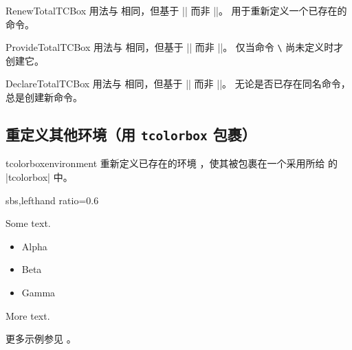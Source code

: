\clearpage

\begin{docCommand}{RenewTotalTCBox}{}
  用法与  相同，但基于 |\RenewDocumentCommand| 而非 |\NewDocumentCommand|。
  用于重新定义一个已存在的命令。
\end{docCommand}

\begin{docCommand}{ProvideTotalTCBox}{}
  用法与  相同，但基于 |\ProvideDocumentCommand| 而非 |\NewDocumentCommand|。
  仅当命令 \texttt{\textbackslash} 尚未定义时才创建它。
\end{docCommand}

\begin{docCommand}{DeclareTotalTCBox}{}
  用法与  相同，但基于 |\DeclareDocumentCommand| 而非 |\NewDocumentCommand|。
  无论是否已存在同名命令，总是创建新命令。
\end{docCommand}



\subsection{重定义其他环境（用 \texttt{tcolorbox} 包裹）}\label{subsec:macros_refine}

\begin{docCommand}[doc new=2014-10-20]{tcolorboxenvironment}{}
  重新定义已存在的环境 ，使其被包裹在一个采用所给
  的 |tcolorbox| 中。
\begin{dispExample*}{sbs,lefthand ratio=0.6}
\newenvironment{myitemize}{%
  \begin{itemize}}{\end{itemize}}


Some text.
\begin{myitemize}
\item Alpha
\item Beta
\item Gamma
\end{myitemize}
More text.
\end{dispExample*}

\medskip
更多示例参见 。
\end{docCommand}

